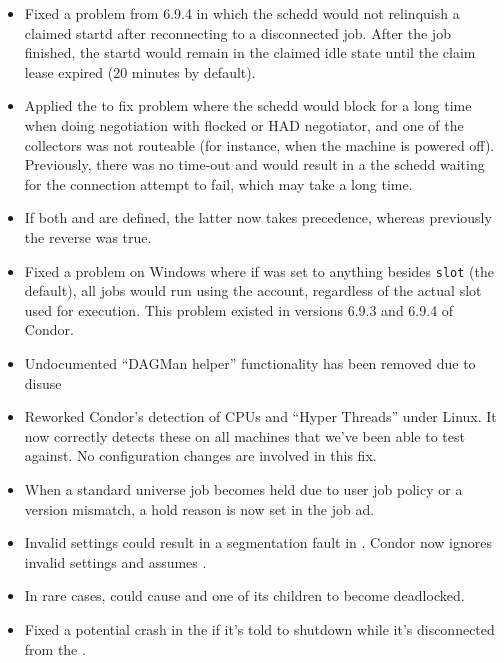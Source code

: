 \begin{itemize}
\item Fixed a problem from 6.9.4 in which the schedd would not
relinquish a claimed startd after reconnecting to a disconnected job.
After the job finished, the startd would remain in the claimed idle
state until the claim lease expired (20 minutes by default).

\item Applied the  to fix problem where the schedd 
would block for a long time when doing negotiation with flocked or HAD 
negotiator, and one of the collectors was not routeable (for instance, when 
the machine is powered off). Previously, there was no time-out and would
result in a the schedd waiting for the connection attempt to fail, which may
take a long time.

\item If both  and
 are defined, the latter
now takes precedence, whereas previously the reverse was true.

\item Fixed a problem on Windows where if
 was set to anything besides
\texttt{slot} (the default), all jobs would run using the
 account, regardless of the actual slot
used for execution. This problem existed in versions 6.9.3 and 6.9.4
of Condor.

\item Undocumented ``DAGMan helper'' functionality has been removed
  due to disuse

\item Reworked Condor's detection of CPUs and ``Hyper Threads'' under
  Linux.  It now correctly detects these on all machines that we've
  been able to test against.  No configuration changes are involved in
  this fix.

\item When a standard universe job becomes held due to user job policy or
a version mismatch, a hold reason is now set in the job ad.

\item Invalid  settings could result in a 
segmentation fault in . 
Condor now ignores invalid settings and assumes .

\item In rare cases,  could cause  and
one of its children to become deadlocked.

\item Fixed a potential crash in the  if it's told to
shutdown while it's disconnected from the .
 
\end{itemize}


